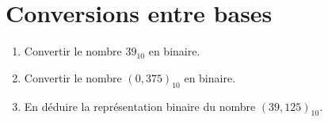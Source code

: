 \documentclass[a4paper,11pt]{article}
\newif\ifsolutions
\begin{document}
\section{Conversions entre bases}
\begin{enumerate}
    \item Convertir le nombre $39_{10}$ en binaire.
    \ifsolutions
    \begin{solbox}
    On effectue les divisions successives par 2 :
    \begin{align*}
        39 &= 2 \times 19 + 1 \\
        19 &= 2 \times 9 + 1 \\
        9 &= 2 \times 4 + 1 \\
        4 &= 2 \times 2 + 0 \\
        2 &= 2 \times 1 + 0 \\
        1 &= 2 \times 0 + 1
    \end{align*}
    En lisant les restes de bas en haut : $39_{10} = \mathbf{100111_2}$.
    \end{solbox}
    \fi

    \item Convertir le nombre $(0,375)_{10}$ en binaire.
    \ifsolutions
    \begin{solbox}
    On effectue les multiplications successives par 2 :
    \begin{align*}
        0,375 \times 2 &= 0,75 \quad (\text{partie entière } 0) \\
        0,75 \times 2  &= 1,50 \quad (\text{partie entière } 1) \\
        0,50 \times 2  &= 1,00 \quad (\text{partie entière } 1)
    \end{align*}
    En lisant les parties entières de haut en bas : $0,375_{10} = \mathbf{0,011_2}$. (On remarque que $0,375 = 3 \times 0,125 = 3 \times 2^{-3}$).
    \end{solbox}
    \fi

    \item En déduire la représentation binaire du nombre $(39,125)_{10}$.
    \ifsolutions
    \begin{solbox}
    On combine les résultats précédents (en notant que $0,125 = 0,001_2$) :
    $$ (39,125)_{10} = \mathbf{100111,001_2} $$
    \end{solbox}
    \fi


\end{enumerate}
\end{document}
